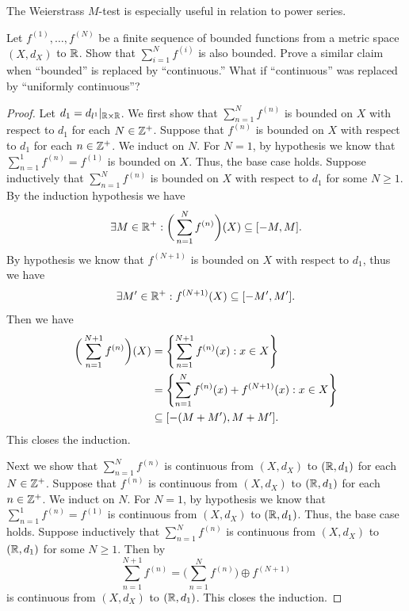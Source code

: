 \begin{note}
  The Weierstrass \(M\)-test is especially useful in relation to power series.
\end{note}

\exercisesection

\begin{ex}\label{ii:ex:3.5.1}
  Let \(f^{(1)}, \dots, f^{(N)}\) be a finite sequence of bounded functions from a metric space \((X, d_X)\) to \(\mathbb{R}\).
  Show that \(\sum_{i = 1}^N f^{(i)}\) is also bounded.
  Prove a similar claim when ``bounded'' is replaced by ``continuous.''
  What if ``continuous'' was replaced by ``uniformly continuous''?
\end{ex}

\begin{proof}
  Let \(d_1 = d_{l^1}|_{\mathbb{R} \times \mathbb{R}}\).
  We first show that \(\sum_{n = 1}^N f^{(n)}\) is bounded on \(X\) with respect to \(d_1\) for each \(N \in \mathbb{Z}^+\).
  Suppose that \(f^{(n)}\) is bounded on \(X\) with respect to \(d_1\) for each \(n \in \mathbb{Z}^+\).
  We induct on \(N\).
  For \(N = 1\), by hypothesis we know that \(\sum_{n = 1}^1 f^{(n)} = f^{(1)}\) is bounded on \(X\).
  Thus, the base case holds.
  Suppose inductively that \(\sum_{n = 1}^N f^{(n)}\) is bounded on \(X\) with respect to \(d_1\) for some \(N \geq 1\).
  By the induction hypothesis we have
  \[
    \exists M \in \mathbb{R}^+ : \bigg(\sum_{n = 1}^N f^{(n)}\bigg)(X) \subseteq [-M, M].
  \]
  By hypothesis we know that \(f^{(N + 1)}\) is bounded on \(X\) with respect to \(d_1\), thus we have
  \[
    \exists M' \in \mathbb{R}^+ : f^{(N + 1)}(X) \subseteq [-M', M'].
  \]
  Then we have
  \begin{align*}
    \bigg(\sum_{n = 1}^{N + 1} f^{(n)}\bigg)(X) & = \left\lbrace\sum_{n = 1}^{N + 1} f^{(n)}(x) : x \in X\right\rbrace            \\
                                                & = \left\lbrace\sum_{n = 1}^N f^{(n)}(x) + f^{(N + 1)}(x) : x \in X\right\rbrace \\
                                                & \subseteq [-(M + M'), M + M'].
  \end{align*}
  This closes the induction.

  Next we show that \(\sum_{n = 1}^N f^{(n)}\) is continuous from \((X, d_X)\) to \((\mathbb{R}, d_1)\) for each \(N \in \mathbb{Z}^+\).
  Suppose that \(f^{(n)}\) is continuous from \((X, d_X)\) to \((\mathbb{R}, d_1)\) for each \(n \in \mathbb{Z}^+\).
  We induct on \(N\).
  For \(N = 1\), by hypothesis we know that \(\sum_{n = 1}^1 f^{(n)} = f^{(1)}\) is continuous from \((X, d_X)\) to \((\mathbb{R}, d_1)\).
  Thus, the base case holds.
  Suppose inductively that \(\sum_{n = 1}^N f^{(n)}\) is continuous from \((X, d_X)\) to \((\mathbb{R}, d_1)\) for some \(N \geq 1\).
  Then by 
  \[
    \sum_{n = 1}^{N + 1} f^{(n)} = \bigg(\sum_{n = 1}^N f^{(n)}\bigg) \oplus f^{(N + 1)}
  \]
  is continuous from \((X, d_X)\) to \((\mathbb{R}, d_1)\).
  This closes the induction.


\end{proof}
